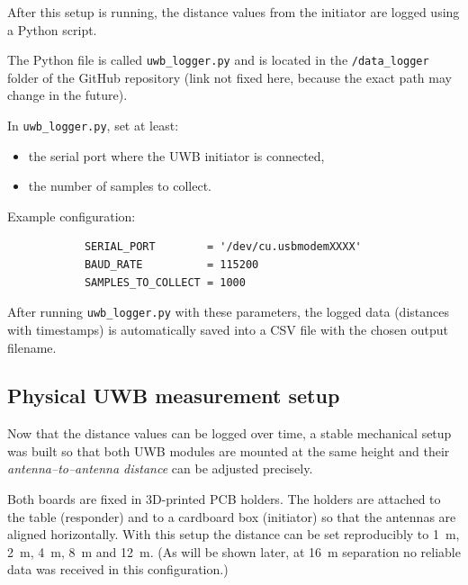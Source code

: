 \documentclass[a4paper,11pt]{article}
\begin{document}
	After this setup is running, the distance values from the initiator are logged
	using a Python script.
	
	The Python file is called \texttt{uwb\_logger.py} and is located in the
	\texttt{/data\_logger} folder of the GitHub repository (link not fixed here,
	because the exact path may change in the future).
	
	\begin{tcolorbox}[title=Python data logger configuration,
		colback=accentlight!60!white,
		sharp corners]
		In \texttt{uwb\_logger.py}, set at least:
		
		\begin{itemize}
			\item the serial port where the UWB initiator is connected,
			\item the number of samples to collect.
		\end{itemize}
		
		Example configuration:
		\begin{verbatim}
			SERIAL_PORT        = '/dev/cu.usbmodemXXXX'
			BAUD_RATE          = 115200
			SAMPLES_TO_COLLECT = 1000
		\end{verbatim}
		
		After running \texttt{uwb\_logger.py} with these parameters, the logged data
		(distances with timestamps) is automatically saved into a CSV file with the
		chosen output filename.
	\end{tcolorbox}
	
	\subsection{Physical UWB measurement setup}
	\label{subsec:uwb-physical-setup}
	
	Now that the distance values can be logged over time, a stable mechanical setup
	was built so that both UWB modules are mounted at the same height and their
	\emph{antenna–to–antenna distance} can be adjusted precisely.
	
	Both boards are fixed in 3D-printed PCB holders. The holders are attached to
	the table (responder) and to a cardboard box (initiator) so that the antennas
	are aligned horizontally. With this setup the distance can be set reproducibly
	to \SI{1}{m}, \SI{2}{m}, \SI{4}{m}, \SI{8}{m} and \SI{12}{m}.  
	(As will be shown later, at \SI{16}{m} separation no reliable data was
	received in this configuration.)
	
\end{document}

